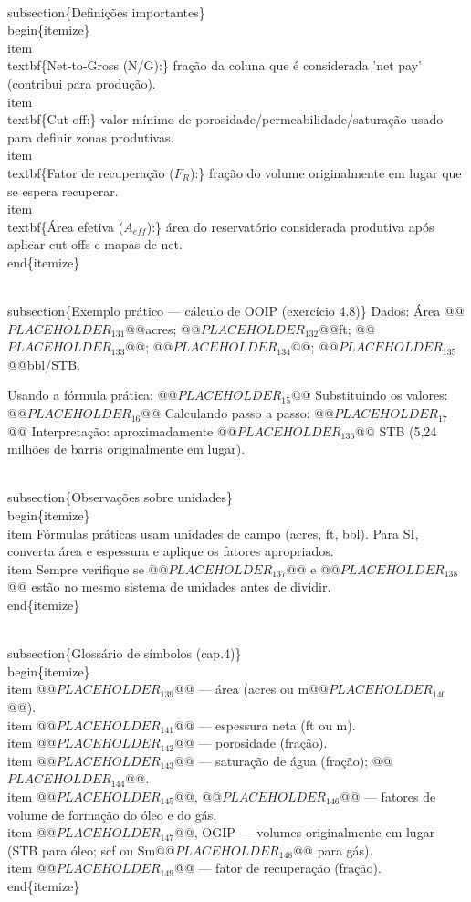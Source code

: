\documentclass[11pt,a4paper]{article}
\begin{document}
\begin{enumerate}
{\\subsection\{Definições importantes\}
\\begin\{itemize\}
\\item \\textbf\{Net‑to‑Gross (N/G):\} fração da coluna que é considerada 'net pay' (contribui para produção).
\\item \\textbf\{Cut‑off:\} valor mínimo de porosidade/permeabilidade/saturação usado para definir zonas produtivas.
\\item \\textbf\{Fator de recuperação ($F_{R}$):\} fração do volume originalmente em lugar que se espera recuperar.
\\item \\textbf\{Área efetiva ($A_{eff}$):\} área do reservatório considerada produtiva após aplicar cut‑offs e mapas de net.
\\end\{itemize\}

\\subsection\{Exemplo prático — cálculo de OOIP (exercício 4.8)\}
Dados: Área @@$PLACEHOLDER_{131}$@@acres; @@$PLACEHOLDER_{132}$@@ft; @@$PLACEHOLDER_{133}$@@; @@$PLACEHOLDER_{134}$@@; @@$PLACEHOLDER_{135}$@@bbl/STB.

Usando a fórmula prática:
@@$PLACEHOLDER_{15}$@@
Substituindo os valores:
@@$PLACEHOLDER_{16}$@@
Calculando passo a passo:
@@$PLACEHOLDER_{17}$@@
Interpretação: aproximadamente @@$PLACEHOLDER_{136}$@@ STB (5,24 milhões de barris originalmente em lugar).

\\subsection\{Observações sobre unidades\}
\\begin\{itemize\}
\\item Fórmulas práticas usam unidades de campo (acres, ft, bbl). Para SI, converta área e espessura e aplique os fatores apropriados.
\\item Sempre verifique se @@$PLACEHOLDER_{137}$@@ e @@$PLACEHOLDER_{138}$@@ estão no mesmo sistema de unidades antes de dividir.
\\end\{itemize\}

\\subsection\{Glossário de símbolos (cap.4)\}
\\begin\{itemize\}
\\item @@$PLACEHOLDER_{139}$@@ — área (acres ou m@@$PLACEHOLDER_{140}$@@).
\\item @@$PLACEHOLDER_{141}$@@ — espessura neta (ft ou m).
\\item @@$PLACEHOLDER_{142}$@@ — porosidade (fração).
\\item @@$PLACEHOLDER_{143}$@@ — saturação de água (fração); @@$PLACEHOLDER_{144}$@@.
\\item @@$PLACEHOLDER_{145}$@@, @@$PLACEHOLDER_{146}$@@ — fatores de volume de formação do óleo e do gás.
\\item @@$PLACEHOLDER_{147}$@@, OGIP — volumes originalmente em lugar (STB para óleo; scf ou Sm@@$PLACEHOLDER_{148}$@@ para gás).
\\item @@$PLACEHOLDER_{149}$@@ — fator de recuperação (fração).
\\end\{itemize\}

}
\end{enumerate}
\end{document}
